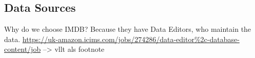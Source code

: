 \subsection{Data Sources}
\label{subsec_method_datasources}

Why do we choose IMDB?
Because they have Data Editors, who maintain the data.
\url{https://uk-amazon.icims.com/jobs/274286/data-editor\%2c-database-content/job} --> vllt als footnote
